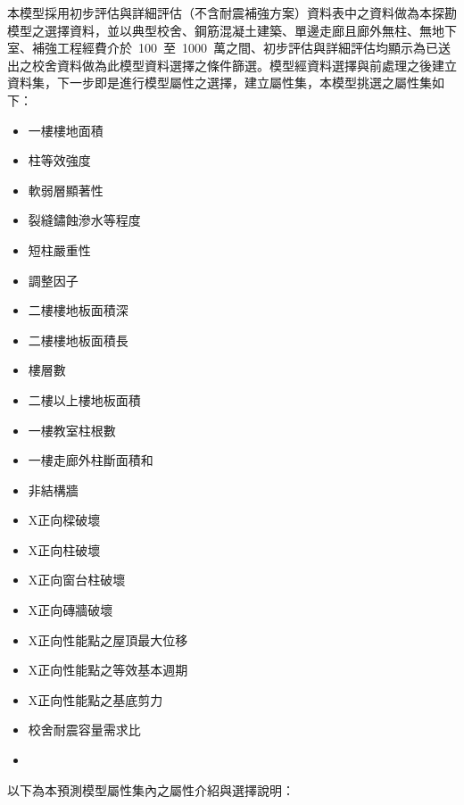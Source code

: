 本模型採用初步評估與詳細評估（不含耐震補強方案）資料表中之資料做為本探勘模型之選擇資料，並以典型校舍、鋼筋混凝土建築、單邊走廊且廊外無柱、無地下室、補強工程經費介於~100~至~1000~萬之間、初步評估與詳細評估均顯示為已送出之校舍資料做為此模型資料選擇之條件篩選。模型經資料選擇與前處理之後建立資料集，下一步即是進行模型屬性之選擇，建立屬性集，本模型挑選之屬性集如下：

\begin{multicols}{2}
\begin{itemize}
\item 一樓樓地面積
\item 柱等效強度
\item 軟弱層顯著性
\item 裂縫鏽蝕滲水等程度
\item 短柱嚴重性
\item 調整因子
\item 二樓樓地板面積深
\item 二樓樓地板面積長
\item 樓層數
\item 二樓以上樓地板面積
\item 一樓教室柱根數
\item 一樓走廊外柱斷面積和
\item 非結構牆
\item X正向樑破壞
\item X正向柱破壞
\item X正向窗台柱破壞
\item X正向磚牆破壞
\item X正向性能點之屋頂最大位移
\item X正向性能點之等效基本週期
\item X正向性能點之基底剪力
\item 校舍耐震容量需求比
\item[]
\end{itemize}
\end{multicols}

以下為本預測模型屬性集內之屬性介紹與選擇說明：

